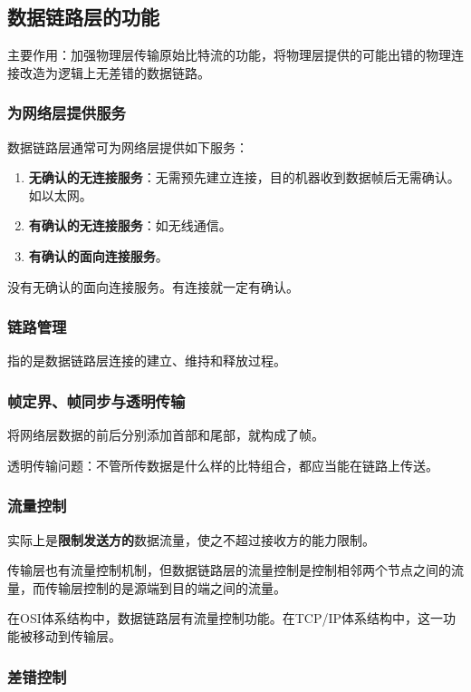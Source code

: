 \documentclass[12pt, a4paper, oneside]{ctexart}
\begin{document}
\subsection{数据链路层的功能}

主要作用：加强物理层传输原始比特流的功能，将物理层提供的可能出错的物理连接改造为逻辑上无差错的数据链路。

\subsubsection{为网络层提供服务}

数据链路层通常可为网络层提供如下服务：
\begin{enumerate}
    \item {\bf 无确认的无连接服务}：无需预先建立连接，目的机器收到数据帧后无需确认。如以太网。
    \item {\bf 有确认的无连接服务}：如无线通信。
    \item {\bf 有确认的面向连接服务}。
\end{enumerate}

没有无确认的面向连接服务。有连接就一定有确认。

\subsubsection{链路管理}

指的是数据链路层连接的建立、维持和释放过程。

\subsubsection{帧定界、帧同步与透明传输}

将网络层数据的前后分别添加首部和尾部，就构成了帧。

透明传输问题：不管所传数据是什么样的比特组合，都应当能在链路上传送。

\subsubsection{流量控制}

实际上是\textbf{限制发送方的}数据流量，使之不超过接收方的能力限制。

传输层也有流量控制机制，但数据链路层的流量控制是控制相邻两个节点之间的流量，而传输层控制的是源端到目的端之间的流量。

在OSI体系结构中，数据链路层有流量控制功能。在TCP/IP体系结构中，这一功能被移动到传输层。

\subsubsection{差错控制}
\end{document}
